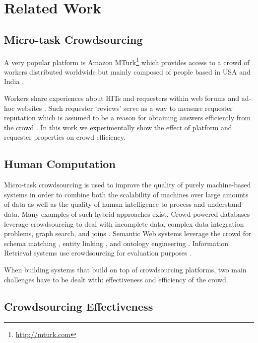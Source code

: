 \section{Related Work}\label{sec:relwork}

\subsection{Micro-task Crowdsourcing}

A very popular platform is Amazon MTurk\footnote{\url{http://mturk.com}} which provides access to a crowd of workers distributed worldwide but mainly composed of people based in USA and India \cite{mturk}.

Workers share experiences about HITs and requesters within web forums and ad-hoc websites \cite{turkopticon}. Such requester `reviews' serve as a way to measure requester reputation which is assumed to be a reason for obtaining answers efficiently from the crowd \cite{}. In this work we experimentally show the effect of platform and requester properties on crowd efficiency.  


\subsection{Human Computation}
Micro-task crowdsourcing is used to improve the quality of purely machine-based systems in order to combine both the scalability of machines over large amounts of data as well as the quality of human intelligence to process and understand data.
Many examples of such hybrid approaches exist.
Crowd-powered databases \cite{crowddb} leverage crowdsourcing to deal with incomplete data, complex data integration problems, graph search, and joins \cite{crowder,graphsearch,crowdjoins}.
Semantic Web systems leverage the crowd for schema matching \cite{crowdmap}, entity linking \cite{zencrowd}, and ontology engineering \cite{bioonto}.
Information Retrieval systems use crowdsourcing for evaluation purposes \cite{mizzaroalonso}.

When building systems that build on top of crowdsourcing platforms, two main challenges have to be dealt with: effectiveness and efficiency  of the crowd.

\subsection{Crowdsourcing Effectiveness}

